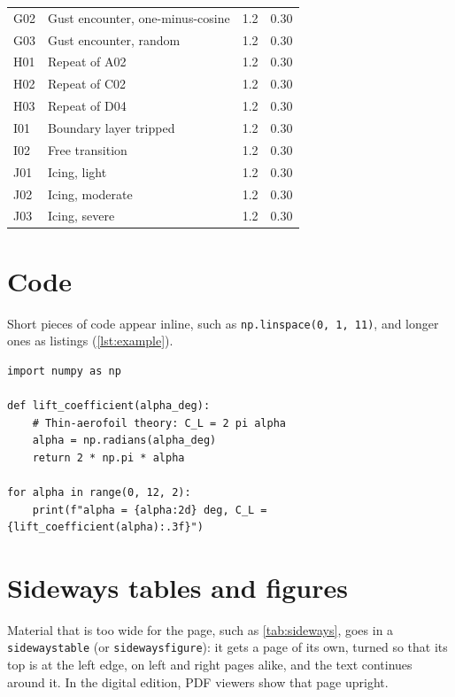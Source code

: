 \begin{xltabular}{\textwidth}{@{}l X S[table-format=1.1] S[table-format=1.2]@{}}
    G02 & Gust encounter, one-minus-cosine & 1.2 & 0.30 \\
    G03 & Gust encounter, random & 1.2 & 0.30 \\
    H01 & Repeat of A02 & 1.2 & 0.30 \\
    H02 & Repeat of C02 & 1.2 & 0.30 \\
    H03 & Repeat of D04 & 1.2 & 0.30 \\
    I01 & Boundary layer tripped & 1.2 & 0.30 \\
    I02 & Free transition & 1.2 & 0.30 \\
    J01 & Icing, light & 1.2 & 0.30 \\
    J02 & Icing, moderate & 1.2 & 0.30 \\
    J03 & Icing, severe & 1.2 & 0.30 \\
\end{xltabular}

\section{Code}\label{sec:code}

Short pieces of code appear inline, such as \lstinline{np.linspace(0, 1, 11)}, and longer ones as listings (\cref{lst:example}).

\begin{lstlisting}[caption={Computing the lift coefficient from thin-aerofoil theory.}, label={lst:example}]
import numpy as np

def lift_coefficient(alpha_deg):
    # Thin-aerofoil theory: C_L = 2 pi alpha
    alpha = np.radians(alpha_deg)
    return 2 * np.pi * alpha

for alpha in range(0, 12, 2):
    print(f"alpha = {alpha:2d} deg, C_L = {lift_coefficient(alpha):.3f}")
\end{lstlisting}

\section{Sideways tables and figures}\label{sec:sideways}

Material that is too wide for the page, such as \cref{tab:sideways}, goes in a \texttt{sidewaystable} (or \texttt{sidewaysfigure}): it gets a page of its own, turned so that its top is at the left edge, on left and right pages alike, and the text continues around it. In the digital edition, PDF viewers show that page upright.

